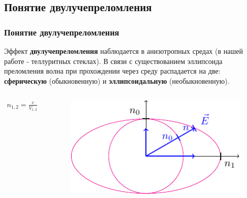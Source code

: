 \documentclass[10pt,pdf,hyperref={unicode}, dvipsnames, handout]{beamer}
\begin{document}
\begin{frame}[t]
	\subsection{Понятие двулучепреломления}
	\frametitle{Понятие двулучепреломления}
	Эффект \textbf{двулучепреломления} наблюдается в анизотропных средах (в нашей работе - теллуритных стеклах). 
	В связи с существованием эллипсоида преломления волна при прохождении через среду распадается на две: \textbf{сферическую} (обыкновенную) и \textbf{эллипсоидальную} (необыкновенную). 
	
	
	\begin{columns}
		\begin{column}{0.5\textwidth}
			
			\begin{gather*}
				n_{1,2}=\frac{c}{V_{1,2}}
			\end{gather*}
			
		\end{column}
		\begin{column}{0.5\textwidth}
			\begin{figure}[tb]
				\centering
				\includegraphics[width=\textwidth]{img/dvp2}
			\end{figure}
		\end{column}
	\end{columns}
\end{frame}
\end{document}
